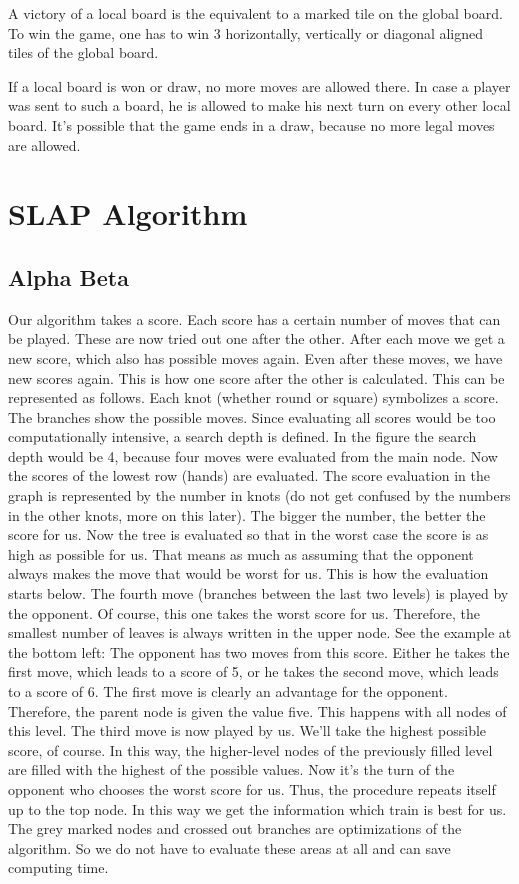 A victory of a local board is the equivalent to a marked tile on the global board. To win the game, one has to win 3 horizontally, vertically or diagonal aligned tiles of the global board.

If a local board is won or draw, no more moves are allowed there. In case a player was sent to such a board, he is allowed to make his next turn on every other local board. It's possible that the game ends in a draw, because  no more legal moves are allowed.

\section{SLAP Algorithm}
\subsection{Alpha Beta}
Our algorithm takes a score. Each score has a certain number of moves that can be played. These are now tried out one after the other. After each move we get a new score, which also has possible moves again. Even after these moves, we have new scores again. This is how one score after the other is calculated. This can be represented as follows. Each knot (whether round or square) symbolizes a score. The branches show the possible moves. Since evaluating all scores would be too computationally intensive, a search depth is defined. In the figure the search depth would be 4, because four moves were evaluated from the main node. Now the scores of the lowest row (hands) are evaluated. The score evaluation in the graph is represented by the number in knots (do not get confused by the numbers in the other knots, more on this later). The bigger the number, the better the score for us. Now the tree is evaluated so that in the worst case the score is as high as possible for us. That means as much as assuming that the opponent always makes the move that would be worst for us. This is how the evaluation starts below. The fourth move (branches between the last two levels) is played by the opponent. Of course, this one takes the worst score for us. Therefore, the smallest number of leaves is always written in the upper node. See the example at the bottom left:
The opponent has two moves from this score. Either he takes the first move, which leads to a score of 5, or he takes the second move, which leads to a score of 6. The first move is clearly an advantage for the opponent. Therefore, the parent node is given the value five. This happens with all nodes of this level. The third move is now played by us. We'll take the highest possible score, of course. In this way, the higher-level nodes of the previously filled level are filled with the highest of the possible values. Now it's the turn of the opponent who chooses the worst score for us. Thus, the procedure repeats itself up to the top node. In this way we get the information which train is best for us. The grey marked nodes and crossed out branches are optimizations of the algorithm. So we do not have to evaluate these areas at all and can save computing time.
